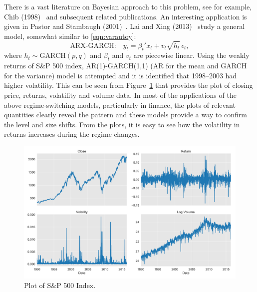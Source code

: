 There is a vast literature on Bayesian approach to this problem, see for example, Chib (1998)~\cite{chib} and subsequent related publications. An interesting application is given in Pastor and Stambaugh (2001)~\cite{pastor}. Lai and Xing (2013)~\cite{laixing} study a general model, somewhat similar to \eqref{eqn:varautoy}:
	\begin{equation} \label{eqn:arxgarch}
	\text{ARX-GARCH:} \quad y_t= \beta_t' x_t + v_t \sqrt{h_t} \, \epsilon_t,
	\end{equation}
where $h_t \sim \text{GARCH}(p,q)$ and $\beta_t$ and $v_t$ are piecewise linear. Using the weakly returns of S\&P 500 index, AR(1)-GARCH(1,1) (AR for the mean and GARCH for the variance) model is attempted and it is identified that 1998--2003 had higher volatility. This can be seen from Figure~\ref{fig:sp500} that provides the plot of closing price, returns, volatility and volume data. In most of the applications of the above regime-switching models, particularly in finance, the plots of relevant quantities clearly reveal the pattern and these models provide a way to confirm the level and size shifts. From the plots, it is easy to see how the volatility in returns increases during the regime changes. 


	\begin{figure}[!ht]
	\centering
	\includegraphics[width=\textwidth]{chapters/chapter_advanced/figures/sp500.png}
	\caption{Plot of S\&P 500 Index. \label{fig:sp500}}
	\end{figure}
	

